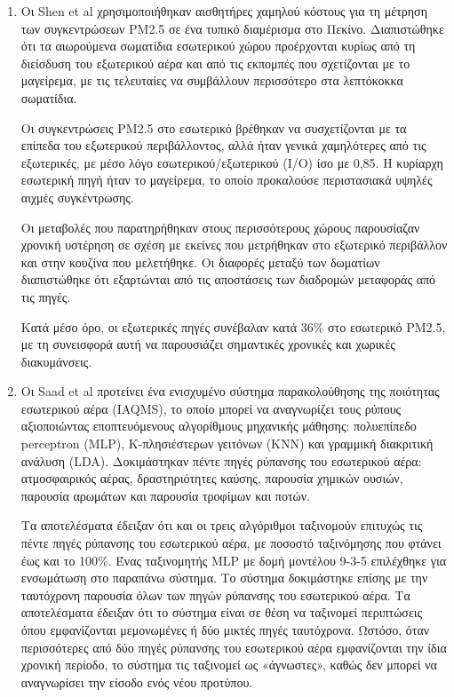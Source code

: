 \begin{enumerate}
    Οι συγκεντρώσεις NO2 στο εσωτερικό επηρεάζονταν επίσης από την απόσταση του κτιρίου από την κύρια κυκλοφορία, καθώς και από τη σχετική υγρασία εσωτερικού χώρου, το O3 , την παρουσία γριλιών αερισμού, 
    τον όγκο του χώρου και τον λόγο επιφάνειας παραθύρων προς επιφάνεια τοίχων.
    
    \item Οι Shen et al \cite{SHEN2021145304}  χρησιμοποιήθηκαν αισθητήρες χαμηλού κόστους για τη μέτρηση των συγκεντρώσεων PM2.5 σε ένα τυπικό διαμέρισμα στο Πεκίνο.
     Διαπιστώθηκε ότι τα αιωρούμενα σωματίδια εσωτερικού χώρου προέρχονται κυρίως από τη διείσδυση του εξωτερικού αέρα και από τις εκπομπές που σχετίζονται με το μαγείρεμα, με τις τελευταίες να συμβάλλουν περισσότερο στα λεπτόκοκκα σωματίδια. 
     
     Οι συγκεντρώσεις PM2.5 στο εσωτερικό βρέθηκαν να συσχετίζονται με τα επίπεδα του εξωτερικού περιβάλλοντος, αλλά ήταν γενικά χαμηλότερες από τις εξωτερικές, με μέσο λόγο εσωτερικού/εξωτερικού (I/O) ίσο με 0,85.
    Η κυρίαρχη εσωτερική πηγή ήταν το μαγείρεμα, το οποίο προκαλούσε περιστασιακά υψηλές αιχμές συγκέντρωσης.

    Οι μεταβολές που παρατηρήθηκαν στους περισσότερους χώρους παρουσίαζαν χρονική υστέρηση σε σχέση με εκείνες που μετρήθηκαν στο εξωτερικό περιβάλλον και στην κουζίνα που μελετήθηκε. 
    Οι διαφορές μεταξύ των δωματίων διαπιστώθηκε ότι εξαρτώνται από τις αποστάσεις των διαδρομών μεταφοράς από τις πηγές.
    
    Κατά μέσο όρο, οι εξωτερικές πηγές συνέβαλαν κατά 36\% στο εσωτερικό PM2.5, με τη συνεισφορά αυτή να παρουσιάζει σημαντικές χρονικές και χωρικές διακυμάνσεις.

    \item Οι Saad et al \cite{Saad2017} προτείνει ένα ενισχυμένο σύστημα παρακολούθησης της ποιότητας εσωτερικού αέρα (IAQMS), το οποίο μπορεί να αναγνωρίζει τους ρύπους αξιοποιώντας εποπτευόμενους αλγορίθμους μηχανικής μάθησης: 
    πολυεπίπεδο perceptron (MLP), K-πλησιέστερων γειτόνων (KNN) και γραμμική διακριτική ανάλυση (LDA). 
    Δοκιμάστηκαν πέντε πηγές ρύπανσης του εσωτερικού αέρα: ατμοσφαιρικός αέρας, δραστηριότητες καύσης, παρουσία χημικών ουσιών, παρουσία αρωμάτων και παρουσία τροφίμων και ποτών.

    Τα αποτελέσματα έδειξαν ότι και οι τρεις αλγόριθμοι ταξινομούν επιτυχώς τις πέντε πηγές ρύπανσης του εσωτερικού αέρα, με ποσοστό ταξινόμησης που φτάνει έως και το 100\%. 
    Ένας ταξινομητής MLP με δομή μοντέλου 9-3-5 επιλέχθηκε για ενσωμάτωση στο παραπάνω σύστημα. Το σύστημα δοκιμάστηκε επίσης με την ταυτόχρονη παρουσία όλων των πηγών ρύπανσης του εσωτερικού αέρα. 
    Τα αποτελέσματα έδειξαν ότι το σύστημα είναι σε θέση να ταξινομεί περιπτώσεις όπου εμφανίζονται μεμονωμένες ή δύο μικτές πηγές ταυτόχρονα. Ωστόσο, όταν περισσότερες από δύο πηγές ρύπανσης του εσωτερικού αέρα εμφανίζονται την ίδια χρονική περίοδο,
     το σύστημα τις ταξινομεί ως «άγνωστες», καθώς δεν μπορεί να αναγνωρίσει την είσοδο ενός νέου προτύπου.


\end{enumerate}
